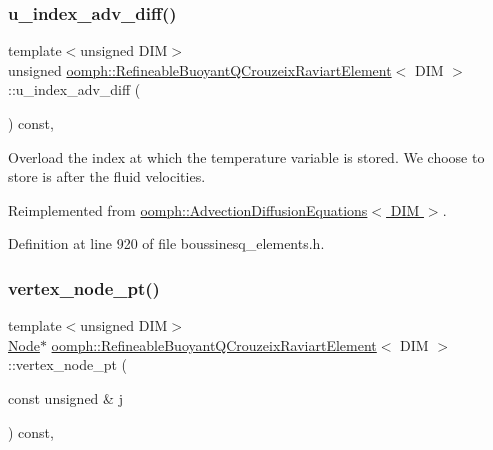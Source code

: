 \subsubsection{\texorpdfstring{u\+\_\+index\+\_\+adv\+\_\+diff()}{u\_index\_adv\_diff()}}
{\footnotesize\ttfamily template$<$unsigned D\+IM$>$ \\
unsigned \hyperlink{classoomph_1_1RefineableBuoyantQCrouzeixRaviartElement}{oomph\+::\+Refineable\+Buoyant\+Q\+Crouzeix\+Raviart\+Element}$<$ D\+IM $>$\+::u\+\_\+index\+\_\+adv\+\_\+diff (\begin{DoxyParamCaption}{ }\end{DoxyParamCaption}) const\hspace{0.3cm}{\ttfamily [inline]}, {\ttfamily [virtual]}}



Overload the index at which the temperature variable is stored. We choose to store is after the fluid velocities. 



Reimplemented from \hyperlink{classoomph_1_1AdvectionDiffusionEquations_aadffa26c42be5d4a1156a7467de48fb8}{oomph\+::\+Advection\+Diffusion\+Equations$<$ D\+I\+M $>$}.



Definition at line 920 of file boussinesq\+\_\+elements.\+h.

\mbox{\label{classoomph_1_1RefineableBuoyantQCrouzeixRaviartElement_a39d79b2fe742148c2d3856ed05ad78db}} 
\subsubsection{\texorpdfstring{vertex\+\_\+node\+\_\+pt()}{vertex\_node\_pt()}}
{\footnotesize\ttfamily template$<$unsigned D\+IM$>$ \\
\hyperlink{classoomph_1_1Node}{Node}$\ast$ \hyperlink{classoomph_1_1RefineableBuoyantQCrouzeixRaviartElement}{oomph\+::\+Refineable\+Buoyant\+Q\+Crouzeix\+Raviart\+Element}$<$ D\+IM $>$\+::vertex\+\_\+node\+\_\+pt (\begin{DoxyParamCaption}\item[{const unsigned \&}]{j }\end{DoxyParamCaption}) const\hspace{0.3cm}{\ttfamily [inline]}, {\ttfamily [virtual]}}



